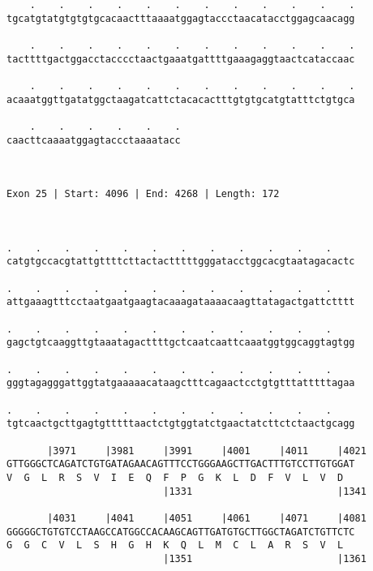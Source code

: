 \documentclass{article}
\begin{document}
\begin{Verbatim}
    .    .    .    .    .    .    .    .    .    .    .    .
tgcatgtatgtgtgtgcacaactttaaaatggagtaccctaacatacctggagcaacagg
                                                            
    .    .    .    .    .    .    .    .    .    .    .    .
tacttttgactggacctacccctaactgaaatgattttgaaagaggtaactcataccaac
                                                            
    .    .    .    .    .    .    .    .    .    .    .    .
acaaatggttgatatggctaagatcattctacacactttgtgtgcatgtatttctgtgca
                                                            
    .    .    .    .    .    .
caacttcaaaatggagtaccctaaaatacc
                              
                              
 
Exon 25 | Start: 4096 | End: 4268 | Length: 172



.    .    .    .    .    .    .    .    .    .    .    .    
catgtgccacgtattgttttcttactactttttgggatacctggcacgtaatagacactc
                                                            
.    .    .    .    .    .    .    .    .    .    .    .    
attgaaagtttcctaatgaatgaagtacaaagataaaacaagttatagactgattctttt
                                                            
.    .    .    .    .    .    .    .    .    .    .    .    
gagctgtcaaggttgtaaatagacttttgctcaatcaattcaaatggtggcaggtagtgg
                                                            
.    .    .    .    .    .    .    .    .    .    .    .    
gggtagagggattggtatgaaaaacataagctttcagaactcctgtgtttatttttagaa
                                                            
.    .    .    .    .    .    .    .    .    .    .    .    
tgtcaactgcttgagtgtttttaactctgtggtatctgaactatcttctctaactgcagg
                                                            
       |3971     |3981     |3991     |4001     |4011     |4021
GTTGGGCTCAGATCTGTGATAGAACAGTTTCCTGGGAAGCTTGACTTTGTCCTTGTGGAT
V  G  L  R  S  V  I  E  Q  F  P  G  K  L  D  F  V  L  V  D  
                           |1331                         |1341
  
       |4031     |4041     |4051     |4061     |4071     |4081
GGGGGCTGTGTCCTAAGCCATGGCCACAAGCAGTTGATGTGCTTGGCTAGATCTGTTCTC
G  G  C  V  L  S  H  G  H  K  Q  L  M  C  L  A  R  S  V  L  
                           |1351                         |1361
  

\end{Verbatim}
\end{document}
